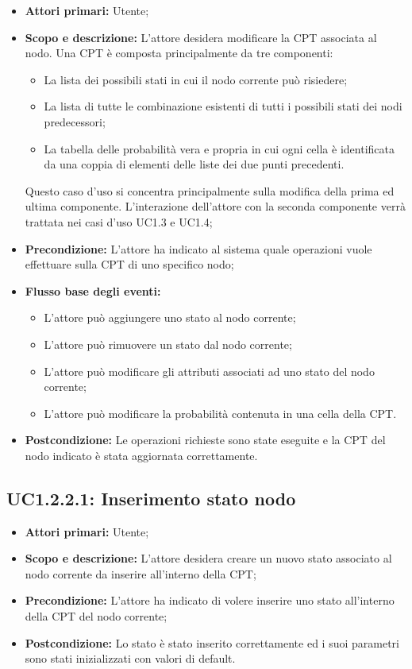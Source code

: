 \begin{itemize} 
	\item{\textbf{Attori primari:} Utente;} 
	\item{\textbf{Scopo e descrizione:} L'attore desidera modificare la CPT associata al nodo. Una CPT è composta principalmente da tre componenti: 
	\begin{itemize} 
		\item{La lista dei possibili stati in cui il nodo corrente può risiedere;} 
		\item{La lista di tutte le combinazione esistenti di tutti i possibili stati dei nodi predecessori;} 
		\item{La tabella delle probabilità vera e propria in cui ogni cella è identificata da una coppia di elementi delle liste dei due punti precedenti.} 
	\end{itemize} 
	Questo caso d'uso si concentra principalmente sulla modifica della prima ed ultima componente. L'interazione dell'attore con la seconda componente verrà trattata nei casi d'uso UC1.3 e UC1.4;
} 
	\item{\textbf{Precondizione:} L'attore ha indicato al sistema quale operazioni vuole effettuare sulla CPT di uno specifico nodo;} 
	\item{\textbf{Flusso base degli eventi:} } 
	\begin{itemize} 
		\item{L'attore può aggiungere uno stato al nodo corrente;} 
		\item{L'attore può rimuovere un stato dal nodo corrente;} 
		\item{L'attore può modificare gli attributi associati ad uno stato del nodo corrente;} 
		\item{L'attore può modificare la probabilità contenuta in una cella della CPT.} 
	\end{itemize} 
	\item{\textbf{Postcondizione:} Le operazioni richieste sono state eseguite e la CPT del nodo indicato è stata aggiornata correttamente.} 
\end{itemize} 
\subsection{UC1.2.2.1: Inserimento stato nodo} 
\begin{itemize} 
	\item{\textbf{Attori primari:} Utente;} 
	\item{\textbf{Scopo e descrizione:} L'attore desidera creare un nuovo stato associato al nodo corrente da inserire all'interno della CPT;} 
	\item{\textbf{Precondizione:} L'attore ha indicato di volere inserire uno stato all'interno della CPT del nodo corrente;} 
	\item{\textbf{Postcondizione:} Lo stato è stato inserito correttamente ed i suoi parametri sono stati inizializzati con valori di default.} 
\end{itemize} 
